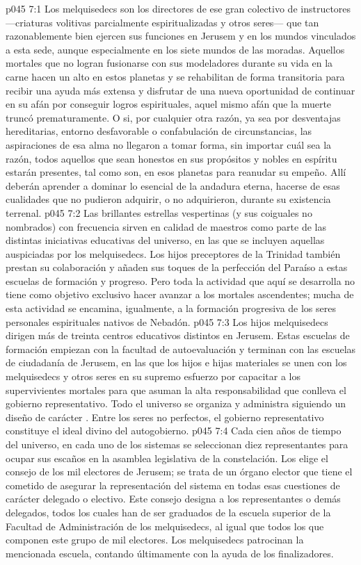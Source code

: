 \vs p045 7:1 Los melquisedecs son los directores de ese gran colectivo de instructores ---criaturas volitivas parcialmente espiritualizadas y otros seres--- que tan razonablemente bien ejercen sus funciones en Jerusem y en los mundos vinculados a esta sede, aunque especialmente en los siete mundos de las moradas. Aquellos mortales que no logran fusionarse con sus modeladores durante su vida en la carne hacen un alto en estos planetas y se rehabilitan de forma transitoria para recibir una ayuda más extensa y disfrutar de una nueva oportunidad de continuar en su afán por conseguir logros espirituales, aquel mismo afán que la muerte truncó prematuramente. O si, por cualquier otra razón, ya sea por desventajas hereditarias, entorno desfavorable o confabulación de circunstancias, las aspiraciones de esa alma no llegaron a tomar forma, sin importar cuál sea la razón, todos aquellos que sean honestos en sus propósitos y nobles en espíritu estarán presentes, tal como son, en esos planetas para reanudar su empeño. Allí deberán aprender a dominar lo esencial de la andadura eterna, hacerse de esas cualidades que no pudieron adquirir, o no adquirieron, durante su existencia terrenal.
\vs p045 7:2 Las brillantes estrellas vespertinas (y sus coiguales no nombrados) con frecuencia sirven en calidad de maestros como parte de las distintas iniciativas educativas del universo, en las que se incluyen aquellas auspiciadas por los melquisedecs. Los hijos preceptores de la Trinidad también prestan su colaboración y añaden sus toques de la perfección del Paraíso a estas escuelas de formación y progreso. Pero toda la actividad que aquí se desarrolla no tiene como objetivo exclusivo hacer avanzar a los mortales ascendentes; mucha de esta actividad se encamina, igualmente, a la formación progresiva de los seres personales espirituales nativos de Nebadón.
\vs p045 7:3 Los hijos melquisedecs dirigen más de treinta centros educativos distintos en Jerusem. Estas escuelas de formación empiezan con la facultad de autoevaluación y terminan con las escuelas de ciudadanía de Jerusem, en las que los hijos e hijas materiales se unen con los melquisedecs y otros seres en su supremo esfuerzo por capacitar a los supervivientes mortales para que asuman la alta responsabilidad que conlleva el gobierno representativo. Todo el universo se organiza y administra siguiendo un diseño de carácter . Entre los seres no perfectos, el gobierno representativo constituye el ideal divino del autogobierno.
\vs p045 7:4 Cada cien años de tiempo del universo, en cada uno de los sistemas se seleccionan diez representantes para ocupar sus escaños en la asamblea legislativa de la constelación. Los elige el consejo de los mil electores de Jerusem; se trata de un órgano elector que tiene el cometido de asegurar la representación del sistema en todas esas cuestiones de carácter delegado o electivo. Este consejo designa a los representantes o demás delegados, todos los cuales han de ser graduados de la escuela superior de la Facultad de Administración de los melquisedecs, al igual que todos los que componen este grupo de mil electores. Los melquisedecs patrocinan la mencionada escuela, contando últimamente con la ayuda de los finalizadores.
